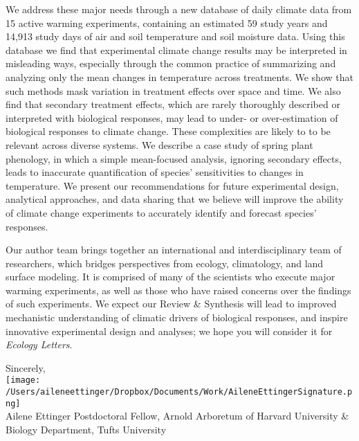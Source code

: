 \documentclass[11pt,a4paper]{letter}
\begin{document}
\begin{letter}{}
We address these major needs through a new database of daily climate data from 15 active warming experiments, containing an estimated 59 study years and 14,913 study days of air and soil temperature and soil moisture data.  Using this database we find that experimental climate change results may be interpreted in misleading ways, especially through the common practice of summarizing and analyzing only the mean changes in temperature across treatments.  We show that such methods mask variation in treatment effects over space and time. We also find that secondary treatment effects, which are rarely thoroughly described or interpreted with biological responses, may lead to under- or over-estimation of biological responses to climate change. These complexities are likely to to be relevant across diverse systems. We describe a case study of spring plant phenology, in which a simple mean-focused analysis, ignoring secondary effects, leads to inaccurate quantification of species' sensitivities to changes in temperature. We present our recommendations for future experimental design, analytical approaches, and data sharing that we believe will improve the ability of climate change experiments to accurately identify and forecast species' responses.

Our author team brings together an international and interdisciplinary team of researchers, which bridges perspectives from ecology, climatology, and land surface modeling. It is comprised of many of the scientists who execute major warming experiments, as well as those who have raised concerns over the findings of such experiments.  We expect our Review \& Synthesis will lead to improved mechanistic understanding of climatic drivers of biological responses, and inspire innovative experimental design and analyses; we hope you will consider it for \emph{Ecology Letters}.

Sincerely,\\

\texttt{[image: /Users/aileneettinger/Dropbox/Documents/Work/AileneEttingerSignature.png]} \\
Ailene Ettinger
Postdoctoral Fellow, Arnold Arboretum of Harvard University \& Biology Department, Tufts University


\end{letter}
\end{document}
